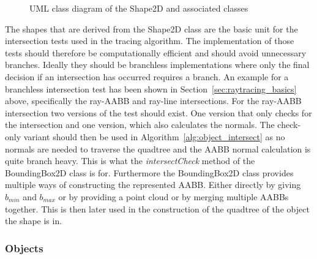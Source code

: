 \documentclass[a4paper,10pt]{article}
\newcommand{\secref}[1]{Section~\ref{#1}}
\newcommand{\algref}[1]{Algorithm~\ref{#1}}
\begin{document}
\begin{center}
\begin{figure}
    \caption{UML class diagram of the Shape2D and associated classes}
    \label{fig:uml_shape2d}
    \end{figure}
    \end{center}

    The shapes that are derived from the Shape2D class are the basic unit
    for the intersection tests used in the tracing algorithm.
    The implementation of those tests should therefore be computationally
    efficient and should avoid unnecessary branches.
    Ideally they should be branchless implementations where only the
    final decision if an intersection has occurred requires a branch.
    An example for a branchless intersection test has been shown
    in \secref{sec:raytracing_basics} above, specifically the ray-AABB
    and ray-line intersections.
    For the ray-AABB intersection two versions of the test should exist.
    One version that only checks for the intersection and one version,
    which also calculates the normals.
    The check-only variant should then be used in 
    \algref{alg:object_intersect}
    as no normals are needed to traverse the quadtree and
    the AABB normal calculation is quite branch heavy.
    This is what the \emph{intersectCheck} method of the BoundingBox2D
    class is for.
    Furthermore the BoundingBox2D class provides multiple ways of constructing
    the represented AABB.
    Either directly by giving $b_{min}$ and $b_{max}$ or by providing a point
    cloud or by merging multiple AABBs together.
    This is then later used in the construction of the quadtree of the object
    the shape is in.

    \subsubsection{Objects} \label{sec:objects}
\end{document}
